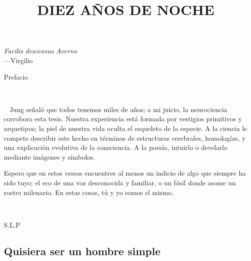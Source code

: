 \documentclass[a4paper, 12pt]{article}
\title{DIEZ AÑOS DE NOCHE}
\begin{document}
\date{}
\maketitle

\pagebreak

\hspace*{\fill}\textit{Facilis descensus Averno}\\
\hspace*{\fill}—Virgilio

\pagebreak
\tableofcontents
\pagebreak
\Huge
\centerline{Prefacio}
\normalsize

~

~ 
Jung señaló que todos tenemos miles de años; a mi juicio, la neurociencia
corrobora esta tesis. Nuestra experiencia está formada por vestigios primitivos
y arquetipos; la piel de nuestra vida oculta el esqueleto de
la especie. A la ciencia le compete describir este hecho en términos de
estructuras cerebrales, homologías, y una explicación evolutiva de la
consciencia. A la poesía, intuirlo o develarlo mediante imágenes y símbolos. ~


Espero que en estos versos encuentres al menos un indicio de algo que siempre
ha sido tuyo; el eco de una voz desconocida y familiar, o un fósil donde asome
un rostro milenario. En estas cosas, tú y yo somos el mismo.


~

\hspace*{\fill}S.L.P
~

\pagebreak

\subsection{Quisiera ser un hombre simple}
~
\end{document}
